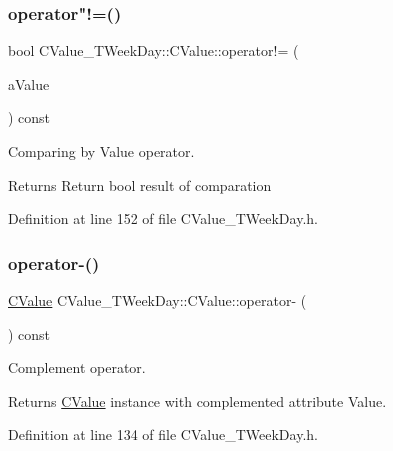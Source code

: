 \subsubsection{\texorpdfstring{operator"!=()}{operator!=()}}
{\footnotesize\ttfamily bool C\+Value\+\_\+\+T\+Week\+Day\+::\+C\+Value\+::operator!= (\begin{DoxyParamCaption}\item[{const \hyperlink{class_c_value___t_week_day_1_1_c_value}{C\+Value} \&}]{a\+Value }\end{DoxyParamCaption}) const\hspace{0.3cm}{\ttfamily [inline]}}



Comparing by Value operator. 

\begin{DoxyReturn}{Returns}
Return {\ttfamily bool} result of comparation 
\end{DoxyReturn}


Definition at line 152 of file C\+Value\+\_\+\+T\+Week\+Day.\+h.

\mbox{\label{class_c_value___t_week_day_1_1_c_value_a19635da2959641b25cd017f3a8edad38}} 
\subsubsection{\texorpdfstring{operator-\/()}{operator-()}}
{\footnotesize\ttfamily \hyperlink{class_c_value___t_week_day_1_1_c_value}{C\+Value} C\+Value\+\_\+\+T\+Week\+Day\+::\+C\+Value\+::operator-\/ (\begin{DoxyParamCaption}{ }\end{DoxyParamCaption}) const\hspace{0.3cm}{\ttfamily [inline]}}



Complement operator. 

\begin{DoxyReturn}{Returns}
\hyperlink{class_c_value___t_week_day_1_1_c_value}{C\+Value} instance with complemented attribute Value. 
\end{DoxyReturn}


Definition at line 134 of file C\+Value\+\_\+\+T\+Week\+Day.\+h.

